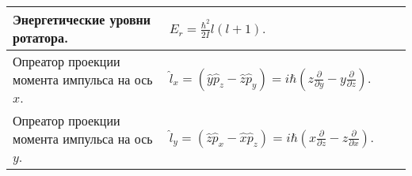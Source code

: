 \documentclass{article}
\begin{document}
\begin{tabular}{ |p{5cm}|p{4.5cm}|p{5cm}|p{4.5cm}|  }
\hline
Энергетические уровни ротатора.                                              &  %
$E_r = \frac{\hbar^2}{2I} l(l+1).$                                           &  %
                                                                             &  %
                                                                             \\ %
\hline
Опреатор проекции момента импульса на ось $x$.                               &  %
$
\hat{l}_x = (\hat{y}\hat{p}_z - \hat{z}\hat{p}_y) = i \hbar 
\left( 
  z\frac{\partial}{\partial y} - y \frac{\partial}{\partial z} 
\right).
$                                                                            &  %
                                                                             &  %
                                                                             \\ %
\hline
Опреатор проекции момента импульса на ось $y$.                               &  %
$
\hat{l}_y = (\hat{z}\hat{p}_x - \hat{x}\hat{p}_z) = i \hbar 
\left( 
  x\frac{\partial}{\partial z} - z \frac{\partial}{\partial x} 
\right).
$                                                                            &  %
                                                                             &  %
                                                                             \\ %
\hline
\end{tabular}

\newpage
\end{document}
